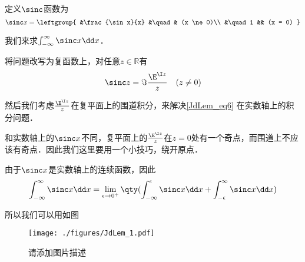 \begin{example}{}\label{JdLem_ex1}

定义$\sinc$函数为
\begin{equation}
\sinc x = 
\leftgroup{
&\frac{\sin x}{x} &\quad & (x \ne 0)\\
&\quad 1 && (x = 0)
}\end{equation}

我们来求$\int_{-\infty}^{\infty}\sinc x\dd x$．

将问题改写为复函数上，对任意$z\in\mathbb{R}$有
\begin{equation}\label{JdLem_eq6}
\sinc z = \Im \frac{\E^{\I z}}{z} \quad  (z \ne 0)
\end{equation}

然后我们考虑$\frac{\E^{\I z}}{z}$在复平面上的围道积分，来解决\autoref{JdLem_eq6} 在实数轴上的积分问题．

和实数轴上的$\sinc x$不同，复平面上的$\frac{\E^{\I z}}{z}$在$z=0$处有一个奇点，而围道上不应该有奇点．因此我们这里要用一个小技巧，绕开原点．

由于$\sinc x$是实数轴上的连续函数，因此
\begin{equation}
\int_{-\infty}^\infty \sinc x \dd x=\lim\limits_{\epsilon\to 0^+}\qty(\int_{-\infty}^\epsilon \sinc x \dd x+\int_{-\epsilon}^\infty \sinc x \dd x)
\end{equation}

所以我们可以用如图

\begin{figure}[ht]
\centering
\texttt{[image: ./figures/JdLem\_1.pdf]}
\caption{请添加图片描述} \label{JdLem_fig1}
\end{figure}



\end{example}





























